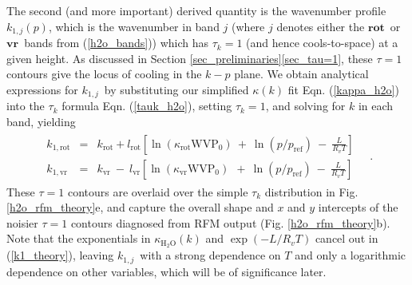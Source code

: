 \documentclass{ametsoc}
\newcommand{\beqa}{\begin{eqnarray}}
\newcommand{\eeqa}{\end{eqnarray}}
\newcommand{\eqnref}[1]{(\ref{#1})}
\newcommand{\Rv}{\ensuremath{R_v}}
\newcommand{\htwo}{\ensuremath{\mathrm{H_2O}}}
\newcommand{\tauk}{\ensuremath{\tau_k}}
\newcommand{\pref}{\ensuremath{p_{\mathrm{ref}}}}
\newcommand{\WVP}{\ensuremath{\mathrm{WVP}}}
\newcommand{\kapparot}{\ensuremath{\kappa_{\mathrm{rot}}}}
\newcommand{\kappavr}{\ensuremath{\kappa_{\mathrm{vr}}}}
\newcommand{\krot}{\ensuremath{k_\mathrm{rot}}}
\newcommand{\kvr}{\ensuremath{k_\mathrm{vr}}}
\newcommand{\konerot}{\ensuremath{k_{1,\mathrm{rot}}}}
\newcommand{\konevr}{\ensuremath{k_{1,\mathrm{vr}}}}
\newcommand{\konej}{\ensuremath{k_{1,j}}}
\newcommand{\lrot}{\ensuremath{l_\mathrm{rot}}}
\newcommand{\lvr}{\ensuremath{l_\mathrm{vr}}}
\newcommand{\vr}{\ensuremath{\mathbf{vr}}}
\newcommand{\rot}{\ensuremath{\mathbf{rot}}}
\begin{document}
The second (and more important) derived quantity is the wavenumber profile $\konej(p)$, which is the wavenumber in band $j$ (where $j$ denotes either the \rot\ or \vr\  bands from \eqnref{h2o_bands}) which has $\tauk=1$ (and hence cools-to-space) at a given height.  As discussed in Section \ref{sec_preliminaries}\ref{sec_tau=1}, these $\tau=1$ contours give the locus of cooling in the $k-p$ plane. We obtain analytical expressions for \konej\  by substituting our simplified $\kappa(k)$ fit  Eqn.  \eqnref{kappa_h2o} into the $\tauk$ formula Eqn. \eqnref{tauk_h2o}, setting $\tauk=1$, and solving for $k$ in each band, yielding
 \beqa
	\begin{split}
	 	\konerot & = & \krot + \lrot\left[\ln(\kapparot\WVP_0) \    + \ \ln(p/\pref) \  - \ \frac{L}{\Rv T} \right]  \\ 
		\konevr  & = &  \kvr \ - \ \lvr\left[\ln(\kappavr\WVP_0) \ \  + \ \ln(p/\pref) \  - \ \frac{L}{\Rv T} \right]   
	\end{split} \quad .
	\label{k1_theory}
\eeqa
These $\tau=1$ contours  are overlaid over the simple $\tauk$ distribution in Fig. \ref{h2o_rfm_theory}e, and capture the overall shape and $x$ and $y$ intercepts of the noisier $\tau=1$ contours diagnosed from RFM output (Fig. \ref{h2o_rfm_theory}b). Note that the exponentials in $\kappa_{\htwo}(k)$ and $\exp(-L/\Rv T)$ cancel out in \eqnref{k1_theory}, leaving \konej\ with a strong dependence on $T$ and only a logarithmic dependence on other variables, which will be of significance later.
\end{document}
